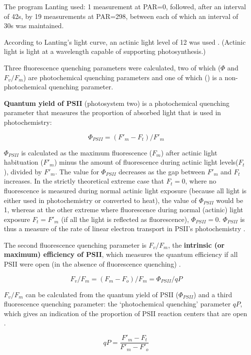 \documentclass[12pt,a4paper,draft]{article}\usepackage[]{graphicx}\usepackage[]{color}
\begin{document}
The program Lanting used: 1 measurement at PAR=0, followed,
after an interval of 42s, by 19 measurements at PAR=298,
between each of which an interval of 30s was maintained.

According to Lanting's light curve, an actinic light level of 12 was used \citep[app.~3]{lanting2010}. (Actinic light is light at a wavelength capable of supporting photosynthesis.)

Three fluorescence quenching parameters were calculated, two of which ($\Phi$ and $F_v / F_m$) are photochemical quenching parameters and one of which () is a non-photochemical quenching parameter.

\textbf{Quantum yield of PSII} (photosystem two) \citep{genty1989} is a photochemical quenching parameter that measures the proportion of absorbed light that is used in photochemistry:
  
$$\Phi_{PSII} = (F'_m - F_t) / F'_m$$

$\Phi_{PSII}$ is calculated as the maximum fluorescence ($F_m$) after actinic light habituation ($F'_m$) minus the amount of fluorescence during actinic light levels($F_t$), divided by $F'_m$. The value for $\Phi_{PSII}$ decreases as the gap between $F'_m$ and $F_t$ increases. In the strictly theoretical extreme case that $F_t=0$, where no fluorescence is measured during normal actinic light exposure (because all light is either used in photochemistry or converted to heat), the value of $\Phi_{PSII}$ would be 1, whereas at the other extreme where fluorescence during normal (actinic) light exposure $F_t=F'_m$ (if all the light is reflected as fluorescence), $\Phi_{PSII}=0$. $\Phi_{PSII}$ is thus a measure of the rate of linear electron transport in PSII's photochemistry \citep{maxwell2000}.

The second fluorescence quenching parameter is $F_v/F_m$, the \textbf{intrinsic (or maximum) efficiency of PSII}, which measures the quantum efficiency if all PSII were open (in the absence of fluorescence quenching) \citep{maxwell2000}.

$$F_v / F_m = (F_m - F_o) / F_m = \Phi_{PSII} / qP$$

$F_v/F_m$ can be calculated from the quantum yield of PSII ($\Phi_{PSII}$) and a third fluorescence quenching parameter: the `photochemical quenching' parameter $qP$, which gives an indication of the proportion of PSII reaction centers that are open \citep{maxwell2000}.
 
$$qP = \frac{F'_m - F_t}{F'_m - F'_o}$$
\end{document}
